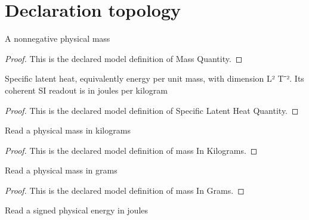 \section{Declaration topology}
\begin{definition}
  \label{def:physics:phyx-mini-0405:phyxminiproblems-problemphyxmini0405-massquantity}
  A nonnegative physical mass
\end{definition}
\begin{proof}
  This is the declared model definition of Mass Quantity.
\end{proof}
\begin{definition}
  \label{def:physics:phyx-mini-0405:phyxminiproblems-problemphyxmini0405-specificlatentheatquantity}
  Specific latent heat, equivalently energy per unit mass, with dimension L² T⁻². Its coherent SI readout is in joules per kilogram
\end{definition}
\begin{proof}
  This is the declared model definition of Specific Latent Heat Quantity.
\end{proof}
\begin{definition}
  \label{def:physics:phyx-mini-0405:phyxminiproblems-problemphyxmini0405-massinkilograms}
  Read a physical mass in kilograms
\end{definition}
\begin{proof}
  This is the declared model definition of mass In Kilograms.
\end{proof}
\begin{definition}
  \label{def:physics:phyx-mini-0405:phyxminiproblems-problemphyxmini0405-massingrams}
  Read a physical mass in grams
\end{definition}
\begin{proof}
  This is the declared model definition of mass In Grams.
\end{proof}
\begin{definition}
  \label{def:physics:phyx-mini-0405:phyxminiproblems-problemphyxmini0405-energyinjoules}
  Read a signed physical energy in joules
\end{definition}
